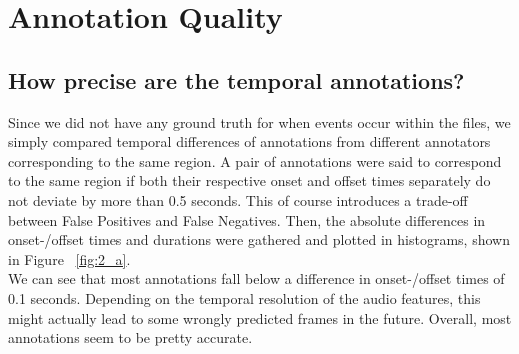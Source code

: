 
\section{Annotation Quality} 
\label{sec:Annotation Quality}


\subsection{How precise are the temporal annotations?}
\label{sec:Annotation Quality:a1}
Since we did not have any ground truth for when events occur within the files, we simply compared temporal differences of annotations from different annotators corresponding to the same region. A pair of annotations were said to correspond to the same region if both their respective onset and offset times separately do not deviate by more than 0.5 seconds. This of course introduces a trade-off between False Positives and False Negatives.
Then, the absolute differences in onset-/offset times and durations were gathered and plotted in histograms, shown in Figure ~\ref{fig:2_a}.\\
We can see that most annotations fall below a difference in onset-/offset times of 0.1 seconds. Depending on the temporal resolution of the audio features, this might actually lead to some wrongly predicted frames in the future. Overall, most annotations seem to be pretty accurate.

